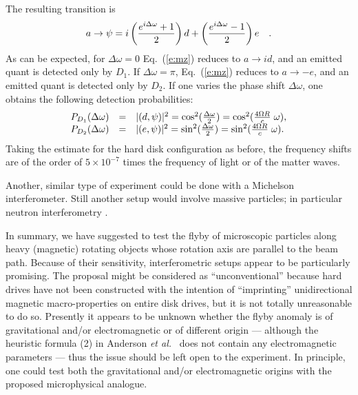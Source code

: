 \documentclass[prl,preprint,amsfonts,showpacs,showkeys]{revtex4}
\begin{document}
The resulting transition is
\begin{equation}
  a  \rightarrow \psi =i\left( {e^{i\Delta \omega} +1\over
2}\right)
d  +
\left( {e^{i\Delta \omega} -1\over 2}\right)
e  \quad .
\label{e:mz}
\end{equation}
As can be expected, for $\Delta \omega =0$ Eq.~(\ref{e:mz}) reduces to $ a  \rightarrow i d $, and an emitted quant is detected only by $D_1$.
If $\Delta \omega =\pi $, Eq.~(\ref{e:mz}) reduces to $ a  \rightarrow -  e  $, and an emitted quant is detected only by $D_2$.
If one varies the phase shift $\Delta \omega$, one obtains the following
detection probabilities:
\begin{equation}
\begin{array}{rcl}
P_{D_1}(\Delta \omega )&=&\vert ( d, \psi ) \vert^2=\cos^2({\Delta \omega \over 2})= \cos^2({{4\Omega R\over c}\;\omega}),\\
P_{D_2}(\Delta \omega )&=&\vert ( e, \psi ) \vert^2=\sin^2({\Delta \omega \over 2})=\sin^2({{4\Omega R\over c}\;\omega }).
\end{array}
\end{equation}
Taking the estimate for the hard disk configuration as before, the frequency shifts are of the order of $5 \times 10^{-7}$ times the frequency of light or of the matter waves.

Another, similar type of experiment could be done with a Michelson interferometer.
Still another setup would involve massive particles; in particular neutron interferometry \cite{rauch-werner}.

In summary, we have suggested to test the flyby of microscopic particles along heavy (magnetic) rotating objects whose rotation axis are parallel to the beam path.
Because of their sensitivity,  interferometric setups appear to be particularly promising.
The proposal might be considered as  ``unconventional'' because hard drives have not been constructed with the intention
of ``imprinting'' unidirectional magnetic macro-properties on entire disk drives, but it is not totally unreasonable to do so.
Presently it appears to be unknown whether the flyby anomaly is of gravitational and/or electromagnetic or of different \cite{adler-arXiv:0805.2895} origin --- although the heuristic formula (2)
in  Anderson {\it et al.}~\cite{anderson:091102}
does not contain any electromagnetic parameters --- thus the issue should be left open to the experiment.
In principle, one could test both the gravitational and/or electromagnetic origins with the proposed microphysical analogue.
\end{document}
